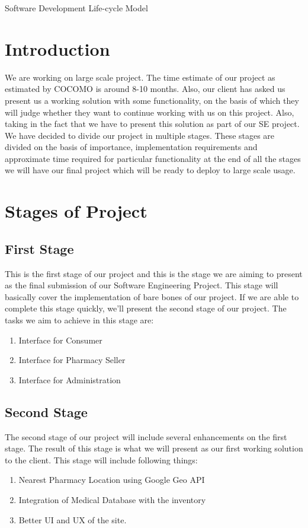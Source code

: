 \documentclass{article}
\begin{document}
\begin{center}
\huge Software Development Life-cycle Model
\end{center}
\section{Introduction}
We are working on large scale project. The time estimate of our project as estimated by COCOMO is around 8-10 months. Also, our client has asked us present us a working solution with some functionality, on the basis of which they will judge whether they want to continue working with us on this project. Also, taking in the fact that we have to present this solution as part of our SE project. We have decided to divide our project in multiple stages. These stages are divided on the basis of importance, implementation requirements and approximate time required for particular functionality at the end of all the stages we will have our final project which will be ready to deploy to large scale usage.
\section{Stages of Project}
\subsection{First Stage}
This is the first stage of our project and this is the stage we are aiming to present as the final submission of our Software Engineering Project. This stage will basically cover the implementation of bare bones of our project. If we are able to complete this stage quickly, we'll present the second stage of our project. The tasks we aim to achieve in this stage are:
\begin{enumerate}
\item Interface for Consumer
\item Interface for Pharmacy Seller
\item Interface for Administration 
\end{enumerate}
\subsection{Second Stage}
The second stage of our project will include several enhancements on the first stage. The result of this stage is what we will present as our first working solution to the client. This stage will include following things:
\begin{enumerate}
\item Nearest Pharmacy Location using Google Geo API
\item Integration of Medical Database with the inventory
\item Better UI and UX of the site.
\end{enumerate}
\end{document}
